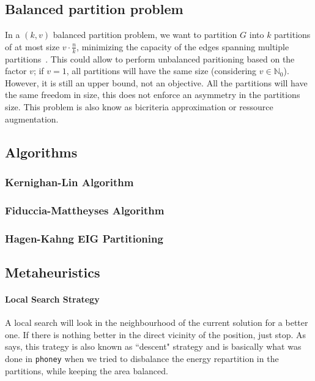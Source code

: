 \documentclass[12pt,a4paper]{article}
\begin{document}
\subsection{Balanced partition problem}
In a $(k, v)$ balanced partition problem, we want to partition $G$ into $k$ partitions of at most size $v\cdot\frac{n}{k}$, minimizing the capacity of the edges spanning multiple partitions~\cite{Andreev:2004:BGP:1007912.1007931}.
This could allow to perform unbalanced paritioning based on the factor $v$; if $v = 1$, all partitions will have the same size (considering $v \in \mathbb{N}_0$).
However, it is still an upper bound, not an objective.
All the partitions will have the same freedom in size, this does not enforce an asymmetry in the partitions size.
This problem is also know as bicriteria approximation or ressource augmentation.

\subsection{Algorithms}
\cite{SungKyuLim:ECE6133:partitioning}
\subsubsection{Kernighan-Lin Algorithm}

\subsubsection{Fiduccia-Mattheyses Algorithm}

\subsubsection{Hagen-Kahng EIG Partitioning}

\subsection{Metaheuristics}

\paragraph{Local Search Strategy}
A local search will look in the neighbourhood of the current solution for a better one.
If there is nothing better in the direct vicinity of the position, just stop.
As \cite{Pirlot1996} says, this trategy is also known as ``descent" strategy and is basically what was done in \texttt{phoney} when we tried to disbalance the energy repartition in the partitions, while keeping the area balanced.
\end{document}
